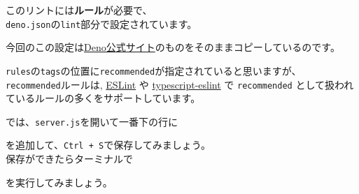 このリントには\textbf{ルール}が必要で、\\
\texttt{deno.json}の\texttt{lint}部分で設定されています。

\begin{Shaded}
\begin{Highlighting}[]
   \FunctionTok{\{}
    \FunctionTok{:} \OtherTok{[}\OtherTok{]}\FunctionTok{,}
    \FunctionTok{:} \FunctionTok{\{}
      \FunctionTok{:} \OtherTok{[}\OtherTok{]}\FunctionTok{,}
      \FunctionTok{:} \OtherTok{[}\OtherTok{]}\FunctionTok{,}
      \FunctionTok{:} \OtherTok{[}\OtherTok{]}
    \FunctionTok{\}}
  \FunctionTok{\}}\ErrorTok{,}
\end{Highlighting}
\end{Shaded}

今回のこの設定は\href{https://deno.land/manual@v1.36.0/getting_started/configuration_file\#lint}{Deno公式サイト}のものをそのままコピーしているのです。

\texttt{rules}の\texttt{tags}の位置に\texttt{recommended}が指定されていると思いますが、\\
\texttt{recommended}ルールは, \href{https://eslint.org/}{ESLint} や
\href{https://typescript-eslint.io/}{typescript-eslint} で
\texttt{recommended}
として扱われているルールの多くをサポートしています。

では、\texttt{server.js}を開いて一番下の行に

\begin{Shaded}
\begin{Highlighting}[]
\OperatorTok{=} \OperatorTok{;}
\end{Highlighting}
\end{Shaded}

を追加して、\texttt{Ctrl\ +\ S}で保存してみましょう。\\
保存ができたらターミナルで

\begin{Shaded}
\begin{Highlighting}[]
\end{Highlighting}
\end{Shaded}

を実行してみましょう。

